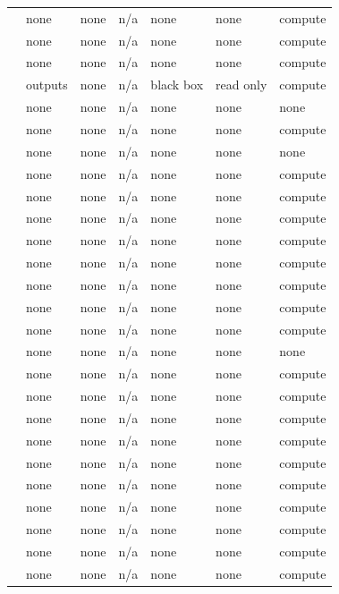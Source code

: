 \begin{landscape}
\begin{longtable}{rllllll}
\cite{HW21} & none & none & n/a & none & none & compute \\
\cite{YHGA25} & none & none & n/a & none & none & compute \\
\cite{AGJ21} & none & none & n/a & none & none & compute \\
\cite{DM22} & outputs & none & n/a & black box & read only & compute \\
\cite{BLMST22} & none & none & n/a & none & none & none \\
\cite{EGV25} & none & none & n/a & none & none & compute \\
\cite{SKMTO26} & none & none & n/a & none & none & none \\
\cite{ABM23} & none & none & n/a & none & none & compute \\
\cite{DGKP20} & none & none & n/a & none & none & compute \\
\cite{HN23} & none & none & n/a & none & none & compute \\
\cite{TME25} & none & none & n/a & none & none & compute \\
\cite{GKY11} & none & none & n/a & none & none & compute \\
\cite{CGGV25} & none & none & n/a & none & none & compute \\
\cite{SW22} & none & none & n/a & none & none & compute \\
\cite{Wei25} & none & none & n/a & none & none & compute \\
\cite{CQYKMHBW24} & none & none & n/a & none & none & none \\
\cite{ABM22} & none & none & n/a & none & none & compute \\
\cite{BM09} & none & none & n/a & none & none & compute \\
\cite{WSPX24} & none & none & n/a & none & none & compute \\
\cite{DKLM26} & none & none & n/a & none & none & compute \\
\cite{GJMMW22} & none & none & n/a & none & none & compute \\
\cite{BGHKP24} & none & none & n/a & none & none & compute \\
\cite{LLW19} & none & none & n/a & none & none & compute \\
\cite{BW08} & none & none & n/a & none & none & compute \\
\cite{GHJS25} & none & none & n/a & none & none & compute \\
\cite{KPR25} & none & none & n/a & none & none & compute \\

\end{longtable}
\end{landscape}
